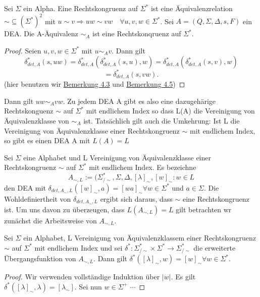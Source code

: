  Sei $\Sigma$ ein Alpha. Eine Rechtskongruenz auf $\Sigma^{*}$ ist eine Äquivalenzrelation $\sim \subseteq (\Sigma^{*})^{2}$ mit $u \sim v \Rightarrow uw \sim vw \quad \forall u, v, w \in \Sigma^{*}$.
Sei $A = (Q, \Sigma, \Delta, s, F)$ ein DEA. Die A-Äquivalenz $\sim_{A}$ ist eine Rechtskonqruenz auf $\Sigma^{*}$.
\begin{proof}
  Seien $u, v, w \in \Sigma^{*}$ mit $u \sim_{A} v$. Dann gilt 
  \[\delta_{det, A}^{*}(s, uw) = \delta_{det,A}^{*}(\delta_{det,A}^{*}(s, u), w) = \delta_{det,A}^{*}(\delta_{det,A}^{*}(s,v), w)\] \[= \delta_{det,A}^{*}(s, vw).\] (hier benutzen wir \hyperref[subsec:4.3]{Bemerkung 4.3} und \hyperref[subsec:4.5]{Bemerkung 4.5})    
\end{proof} 
Dann gilt $uw\sim_{A}vw.$ Zu jedem DEA A gibt es also eine dazugehärige Rechtskonguenz $\sim$ auf $\Sigma^{*}$ mit endlichem Index so dass L(A) die Vereinigung von Äquivalenzklasse von $\sim_{A}$ ist. Tatsächlich gilt auch die Umkehrung: Ist L die Vereinigung von Äquivalenzklasse einer Rechtskongruenz $\sim$ mit endlichem Index, so gibt es einen DEA A mit $L(A) = L$

 Sei $\Sigma$ eine Alphabet und L Vereinigung von Äquivalenzklasse einer Rechtskongruenz $\sim$ auf $\Sigma^{*}$ mit endlichem Index. Es bezeichne
\[A_{\sim , L} := (\Sigma^{*}_{/\sim}, \Sigma, \Delta, [\lambda]_{\sim}, {[w]_{\sim} : w \in L}\]
den DEA mit $\delta_{det, A_{\sim}, L}([w]_{\sim}, a) = [wa]_{\sim} \forall w \in \Sigma^{*}$ und $a \in \Sigma$. Die Wohldefiniertheit von $\delta_{det, A_{\sim}, L}$ ergibt sich daraus, dass $\sim$ eine Rechtskongruenz ist. Um uns davon zu überzeugen, dass $L(A_{\sim, L}) = L$ gilt betrachten wr zunächst die Arbeitsweise von $A_{\sim, L}$.

 Sei $\Sigma$ ein Alphabet, L Vereinigung von Äquivalenzklassem einer Rechtskongruenz $\sim$ auf $\Sigma^{*}$ mit endlichem Index und sei $\delta^{*} : \Sigma^{*}_{/\sim} \times \Sigma^{*} \rightarrow \Sigma^{*}_{/\sim}$ die erweiterte Übergangsfunktion von $A_{\sim, L}$. Dann gilt $\delta^{*}([\lambda]_{\sim}, w) = [w]_{\sim} \forall w \in \Sigma^{*}$. 
\begin{proof}
  Wir verwenden vollständige Induktion über $|w|$. Es gilt $\delta^{*}([\lambda]_{\sim}, \lambda) = [\lambda_{\sim}]$. Sei nun $w \in \Sigma^{+}$ $\cdots$  
\end{proof}

